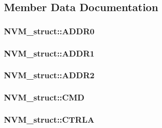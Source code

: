 \subsection{Member Data Documentation}
\hypertarget{struct_n_v_m__struct_ad8b53ef342d117b9e85a670e06219597}{
\subsubsection[{ADDR0}]{ {\bf NVM\_\-struct::ADDR0}}}
\label{struct_n_v_m__struct_ad8b53ef342d117b9e85a670e06219597}
\hypertarget{struct_n_v_m__struct_ad4421f9c21f662620a89d14b2a3a98fb}{
\subsubsection[{ADDR1}]{ {\bf NVM\_\-struct::ADDR1}}}
\label{struct_n_v_m__struct_ad4421f9c21f662620a89d14b2a3a98fb}
\hypertarget{struct_n_v_m__struct_a7ad724fd0577fed763a8885746551836}{
\subsubsection[{ADDR2}]{ {\bf NVM\_\-struct::ADDR2}}}
\label{struct_n_v_m__struct_a7ad724fd0577fed763a8885746551836}
\hypertarget{struct_n_v_m__struct_a07631b8ca739c12e2cc5e0435f749234}{
\subsubsection[{CMD}]{ {\bf NVM\_\-struct::CMD}}}
\label{struct_n_v_m__struct_a07631b8ca739c12e2cc5e0435f749234}
\hypertarget{struct_n_v_m__struct_ab7bec0ac2126e1869a4c24fbb37bd838}{
\subsubsection[{CTRLA}]{ {\bf NVM\_\-struct::CTRLA}}}
